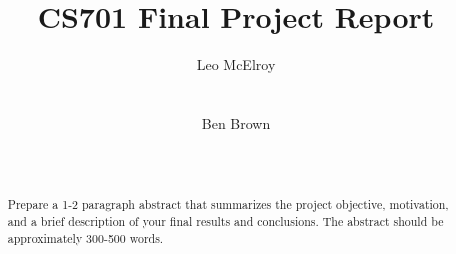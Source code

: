 \documentclass{sig-alternate-05-2015}
\begin{document}
\title{CS701 Final Project Report}


\author{
%
\alignauthor
Leo McElroy\\
       \\
       \\
\alignauthor
Ben Brown\\
       \\
       \\
}

\maketitle

\begin{abstract}

	Prepare a 1-2 paragraph abstract that summarizes the project objective,
	motivation, and a brief description of your final results and conclusions.
	The abstract should be approximately 300-500 words.

\end{abstract}



















\end{document}
